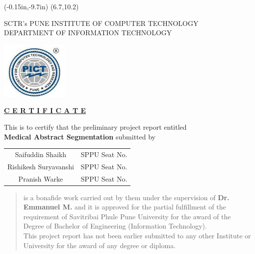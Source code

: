 \documentclass[12pt,a4paper]{report}     %
\begin{document}
	\thisfancyput(-0.15in,-9.7in){%
\setlength{\unitlength}{1in}\framebox(6.7,10.2)}
\begin{center}

{ SCTR's
   PUNE INSTITUTE OF COMPUTER TECHNOLOGY \\
   \small{DEPARTMENT OF INFORMATION TECHNOLOGY} \\

}
\vspace{0.10in}

\vspace{0.1in}
\includegraphics[scale=1.5]{pict_logo.png}
\end{center}
\vspace{0.075in}
\begin{center}
\textbf{\underline{C E R T I F I C A T E}}
\vspace{0.08in}
\end{center}
		\noindent
  				\setlength{\baselineskip}{1.1\baselineskip}
	\begin{center}
This is to certify that the preliminary project report entitled  \\
		\textbf{Medical Abstract Segmentation} 
\singlespace
submitted by\\
\begin{center}
\begin{tabular}{ c c }
    
    Saifuddin Shaikh & SPPU Seat No. \\
    Rishikesh Suryavanshi & SPPU Seat No. \\
    Pranish Warke & SPPU Seat No. \\
\end{tabular}
 
	\end{center}
	\end{center}

\onehalfspace
\begin{quote}
is a bonafide work carried out by them under the supervision of \textbf{Dr. Emmanuel M.} and
it is approved for the partial fulfillment of the requirement of Savitribai Phule Pune University for the award of the Degree of Bachelor of Engineering (Information Technology).\\

This project report has not been earlier submitted to any other Institute or University for the award of any degree or diploma.\\
\end{quote}
		\noindent 
		
\end{document}
